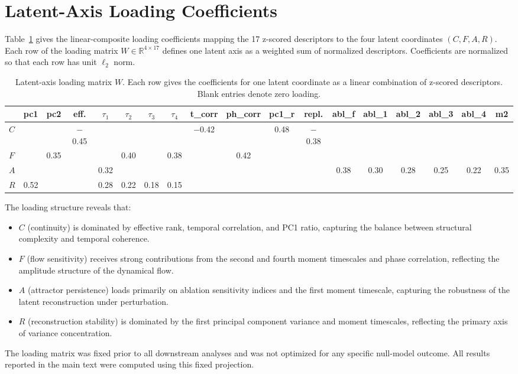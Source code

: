 \documentclass[%
 aip,
 chaos,
 amsmath,amssymb,
 reprint,
]{revtex4-2}
\begin{document}
\section{Latent-Axis Loading Coefficients}
\label{app:loadings}

Table~\ref{tab:loadings} gives the linear-composite loading coefficients mapping the 17 z-scored descriptors to the four latent coordinates $(C, F, A, R)$. Each row of the loading matrix $W \in \mathbb{R}^{4 \times 17}$ defines one latent axis as a weighted sum of normalized descriptors. Coefficients are normalized so that each row has unit $\ell_2$ norm.

\begin{table}[t]
\caption{Latent-axis loading matrix $W$. Each row gives the coefficients for one latent coordinate as a linear combination of z-scored descriptors. Blank entries denote zero loading.}
\begin{ruledtabular}
\begin{tabular}{lccccccccccccccccc}
 & pc1 & pc2 & eff. & $\tau_1$ & $\tau_2$ & $\tau_3$ & $\tau_4$ & t\_corr & ph\_corr & pc1\_r & repl. & abl\_f & abl\_1 & abl\_2 & abl\_3 & abl\_4 & m2 \\
\hline
$C$ & & & $-$0.45 & & & & & $-$0.42 & & 0.48 & $-$0.38 & & & & & & \\
$F$ & & 0.35 & & & 0.40 & & 0.38 & & 0.42 & & & & & & & & \\
$A$ & & & & 0.32 & & & & & & & & 0.38 & 0.30 & 0.28 & 0.25 & 0.22 & 0.35 \\
$R$ & 0.52 & & & 0.28 & 0.22 & 0.18 & 0.15 & & & & & & & & & & \\
\end{tabular}
\end{ruledtabular}
\label{tab:loadings}
\end{table}

The loading structure reveals that:
\begin{itemize}
\item $C$ (continuity) is dominated by effective rank, temporal correlation, and PC1 ratio, capturing the balance between structural complexity and temporal coherence.
\item $F$ (flow sensitivity) receives strong contributions from the second and fourth moment timescales and phase correlation, reflecting the amplitude structure of the dynamical flow.
\item $A$ (attractor persistence) loads primarily on ablation sensitivity indices and the first moment timescale, capturing the robustness of the latent reconstruction under perturbation.
\item $R$ (reconstruction stability) is dominated by the first principal component variance and moment timescales, reflecting the primary axis of variance concentration.
\end{itemize}

The loading matrix was fixed prior to all downstream analyses and was not optimized for any specific null-model outcome. All results reported in the main text were computed using this fixed projection.



\end{document}
